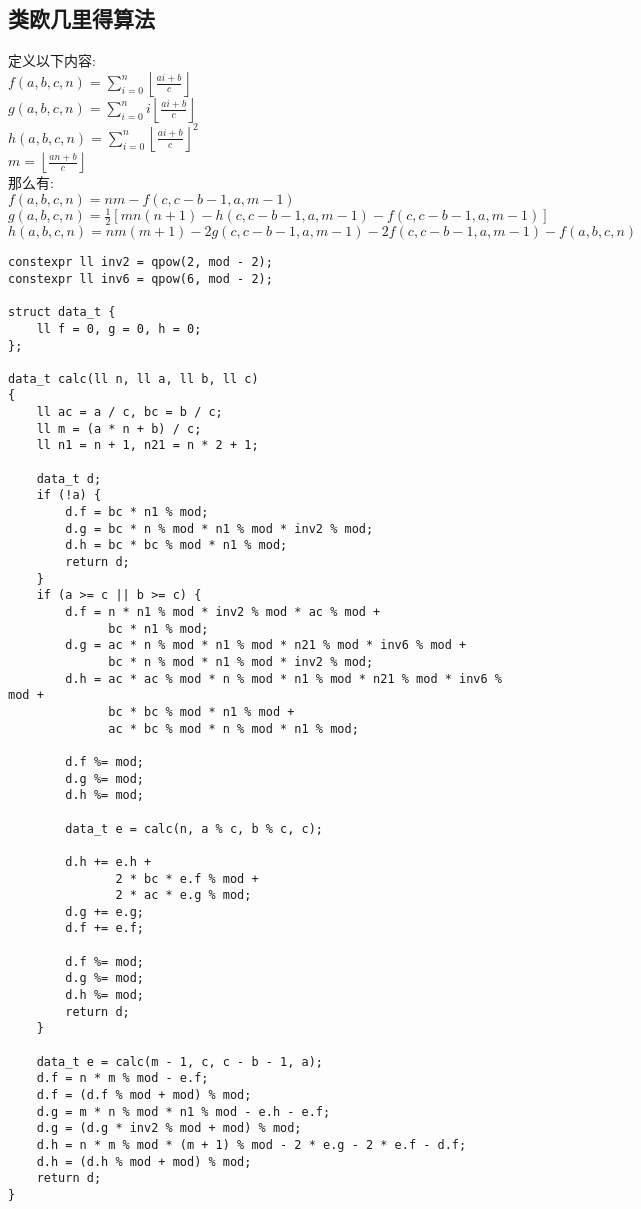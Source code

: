 \documentclass[twocolumn,a4]{article}
\begin{document}
\subsection{类欧几里得算法}
定义以下内容: \\
$\displaystyle f(a,b,c,n)=\sum_{i=0}^{n}\left\lfloor \frac{ai+b}{c} \right\rfloor$\\
$\displaystyle g(a,b,c,n)=\sum_{i=0}^{n}i\left\lfloor \frac{ai+b}{c} \right\rfloor$\\
$\displaystyle h(a,b,c,n)=\sum_{i=0}^{n}{\left\lfloor \frac{ai+b}{c} \right\rfloor}^2$\\
$\displaystyle m=\left \lfloor \frac{an+b}{c} \right \rfloor$\\
那么有: \\
$f(a,b,c,n)=nm-f(c,c-b-1,a,m-1)$\\
$g(a,b,c,n)=\frac{1}{2}[mn(n+1)-h(c,c-b-1,a,m-1)-f(c,c-b-1,a,m-1)]$\\
$h(a,b,c,n)=nm(m+1)-2g(c,c-b-1,a,m-1)-2f(c,c-b-1,a,m-1)-f(a,b,c,n)$
\begin{lstlisting}
constexpr ll inv2 = qpow(2, mod - 2);
constexpr ll inv6 = qpow(6, mod - 2);

struct data_t {
    ll f = 0, g = 0, h = 0;
};

data_t calc(ll n, ll a, ll b, ll c)
{
    ll ac = a / c, bc = b / c;
    ll m = (a * n + b) / c;
    ll n1 = n + 1, n21 = n * 2 + 1;

    data_t d;
    if (!a) {
        d.f = bc * n1 % mod;
        d.g = bc * n % mod * n1 % mod * inv2 % mod;
        d.h = bc * bc % mod * n1 % mod;
        return d;
    }
    if (a >= c || b >= c) {
        d.f = n * n1 % mod * inv2 % mod * ac % mod +
              bc * n1 % mod;
        d.g = ac * n % mod * n1 % mod * n21 % mod * inv6 % mod +
              bc * n % mod * n1 % mod * inv2 % mod;
        d.h = ac * ac % mod * n % mod * n1 % mod * n21 % mod * inv6 % mod +
              bc * bc % mod * n1 % mod +
              ac * bc % mod * n % mod * n1 % mod;

        d.f %= mod;
        d.g %= mod;
        d.h %= mod;

        data_t e = calc(n, a % c, b % c, c);

        d.h += e.h +
               2 * bc * e.f % mod +
               2 * ac * e.g % mod;
        d.g += e.g;
        d.f += e.f;

        d.f %= mod;
        d.g %= mod;
        d.h %= mod;
        return d;
    }

    data_t e = calc(m - 1, c, c - b - 1, a);
    d.f = n * m % mod - e.f;
    d.f = (d.f % mod + mod) % mod;
    d.g = m * n % mod * n1 % mod - e.h - e.f;
    d.g = (d.g * inv2 % mod + mod) % mod;
    d.h = n * m % mod * (m + 1) % mod - 2 * e.g - 2 * e.f - d.f;
    d.h = (d.h % mod + mod) % mod;
    return d;
}
\end{lstlisting}
\end{document}
